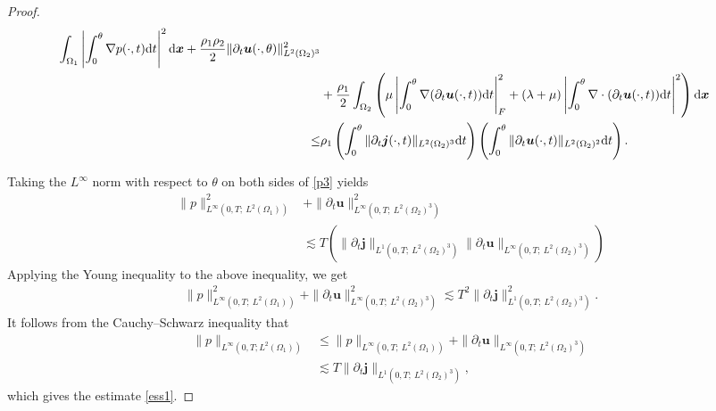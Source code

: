 \documentclass[final,leqno]{siamltex}
\begin{document}
\begin{proof}
\begin{align}
\int_{\Omega_1} \left| \int_0^{\theta} \nabla p (\cdot, t) {\rm d} t \right|^2
{\rm d} \boldsymbol  x
 + \frac{\rho_1 \rho_2}{2}\| \partial_t\boldsymbol u (\cdot, \theta)\|^2_{L^2
(\Omega_2)^3}\nonumber\\
 &+\frac{\rho_1}{2} \int_{\Omega_2} \left( \mu \left| \int_0^{\theta} \nabla
(\partial_t \boldsymbol u (\cdot, t)) {\rm d} t \right|^2_{F} +
 (\lambda+\mu) \left| \int_0^{\theta} \nabla \cdot (\partial_t  \boldsymbol u
(\cdot, t)) {\rm d} t \right|^2\right) {\rm d} \boldsymbol  x \nonumber\\
  \leq & \rho_1\left( \int_0^{\theta} \|\partial_t  \boldsymbol j (\cdot,
t)\|_{L^2 (\Omega_2)^3} {\rm d }t\right)
 \left( \int_0^{\theta} \|\partial_t  \boldsymbol u (\cdot, t)\|_{L^2
(\Omega_2)^2} {\rm d }t\right).\label{p3}
\end{align}

Taking the $L^{\infty}$ norm with respect to $\theta$ on both sides of
\eqref{p3} yields
\begin{align*}
 \|p\|^2_{L^{\infty}\left(0, T;~ L^2(\Omega_1) \right)}& +\|\partial_t
\boldsymbol u\|^2_{L^{\infty}\left(0, T;~ L^2(\Omega_2)^3 \right)}\\
 &\lesssim T \left( \|\partial_t \boldsymbol j\|_{L^1(0, T; ~L^2 (\Omega_2)^3)}
\|\partial_t \boldsymbol u\|_{L^{\infty}\left(0, T;~ L^2(\Omega_2)^3
\right)}\right)
\end{align*}
Applying the Young inequality to the above inequality, we get
\begin{align}\label{yi}
  \|p\|^2_{L^{\infty}(0, T;~ L^2(\Omega_1))} +\|\partial_t \boldsymbol
u\|^2_{L^{\infty}(0, T;~ L^2(\Omega_2)^3 )}\lesssim T^2  \|\partial_t
\boldsymbol j\|^2_{L^1(0, T; ~L^2 (\Omega_2)^3)}.
\end{align}
It follows from the Cauchy--Schwarz inequality that
\begin{align*}
 \|p\|_{L^{\infty} (0, T; L^2 (\Omega_1))} &\leq \|p\|_{L^{\infty}\left(0, T;~
L^2(\Omega_1) \right)} +\|\partial_t \boldsymbol u\|_{L^{\infty}\left(0, T;~
L^2(\Omega_2)^3 \right)}\\
 &\lesssim T  \|\partial_t \boldsymbol j\|_{L^1(0, T; ~L^2 (\Omega_2)^3)},
\end{align*}
which gives the estimate \eqref{ess1}.


\end{proof}
\end{document}

